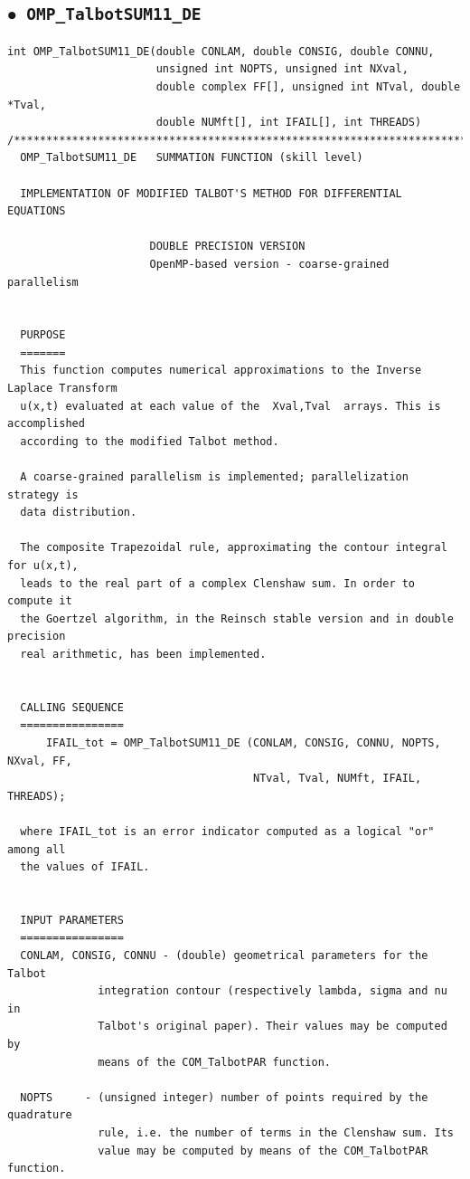 \documentclass[a4paper,10pt]{report}%
\begin{document}
\subsection{\texorpdfstring{$\boldsymbol{\bullet}$}{ - }{\tt\ OMP\_TalbotSUM11\_DE}}
\begin{lstlisting}
int OMP_TalbotSUM11_DE(double CONLAM, double CONSIG, double CONNU,
                       unsigned int NOPTS, unsigned int NXval,
                       double complex FF[], unsigned int NTval, double *Tval,
                       double NUMft[], int IFAIL[], int THREADS)
/*****************************************************************************
  OMP_TalbotSUM11_DE   SUMMATION FUNCTION (skill level)

  IMPLEMENTATION OF MODIFIED TALBOT'S METHOD FOR DIFFERENTIAL EQUATIONS

                      DOUBLE PRECISION VERSION
                      OpenMP-based version - coarse-grained parallelism


  PURPOSE
  =======
  This function computes numerical approximations to the Inverse Laplace Transform
  u(x,t) evaluated at each value of the  Xval,Tval  arrays. This is accomplished
  according to the modified Talbot method.

  A coarse-grained parallelism is implemented; parallelization strategy is
  data distribution.

  The composite Trapezoidal rule, approximating the contour integral for u(x,t),
  leads to the real part of a complex Clenshaw sum. In order to compute it
  the Goertzel algorithm, in the Reinsch stable version and in double precision
  real arithmetic, has been implemented.


  CALLING SEQUENCE
  ================
      IFAIL_tot = OMP_TalbotSUM11_DE (CONLAM, CONSIG, CONNU, NOPTS, NXval, FF,
                                      NTval, Tval, NUMft, IFAIL, THREADS);

  where IFAIL_tot is an error indicator computed as a logical "or" among all
  the values of IFAIL.


  INPUT PARAMETERS
  ================
  CONLAM, CONSIG, CONNU - (double) geometrical parameters for the Talbot
              integration contour (respectively lambda, sigma and nu in
              Talbot's original paper). Their values may be computed by
              means of the COM_TalbotPAR function.

  NOPTS     - (unsigned integer) number of points required by the quadrature
              rule, i.e. the number of terms in the Clenshaw sum. Its
              value may be computed by means of the COM_TalbotPAR function.


\end{lstlisting}
\end{document}
